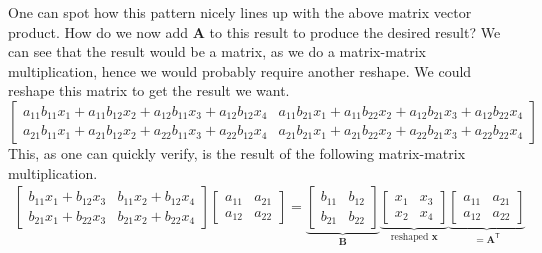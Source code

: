 \documentclass{article}
\begin{document}
One can spot how this pattern nicely lines up with the above matrix vector product. How do we now add $\mathbf{A}$ to this result to produce the desired result? We can see that the result would be a matrix, as we do a matrix-matrix multiplication, hence we would probably require another reshape. We could reshape this matrix to get the result we want.
\begin{equation*}
    \begin{bmatrix}
         a_{11}b_{11}x_{1} + a_{11}b_{12}x_{2} + a_{12}b_{11}x_{3} + a_{12}b_{12}x_{4} &
         a_{11}b_{21}x_{1} + a_{11}b_{22}x_{2} + a_{12}b_{21}x_{3} + a_{12}b_{22}x_{4} \\
         a_{21}b_{11}x_{1} + a_{21}b_{12}x_{2} + a_{22}b_{11}x_{3} + a_{22}b_{12}x_{4} &
         a_{21}b_{21}x_{1} + a_{21}b_{22}x_{2} + a_{22}b_{21}x_{3} + a_{22}b_{22}x_{4}
    \end{bmatrix}
\end{equation*}
This, as one can quickly verify, is the result of the following matrix-matrix multiplication.
\begin{align*}
    \begin{bmatrix}
    b_{11}x_{1} + b_{12}x_{3} & b_{11}x_{2} + b_{12}x_{4} \\
    b_{21}x_{1} + b_{22}x_{3} & b_{21}x_{2} + b_{22}x_{4}
    \end{bmatrix}\begin{bmatrix}
    a_{11} & a_{21} \\
    a_{12} & a_{22}
    \end{bmatrix} 
    = 
\underbrace{
    \begin{bmatrix}
        b_{11} & b_{12} \\
        b_{21} & b_{22}
    \end{bmatrix}}_{\mathbf{B}} \underbrace{
    \begin{bmatrix}
        x_{1} & x_{3} \\
        x_{2} & x_{4}
\end{bmatrix}}_{\text{reshaped } \mathbf{x}} \underbrace{\begin{bmatrix}
    a_{11} & a_{21} \\
    a_{12} & a_{22}
\end{bmatrix}}_{=\mathbf{A}^{\mathsf{T}}}
\end{align*}
\end{document}
